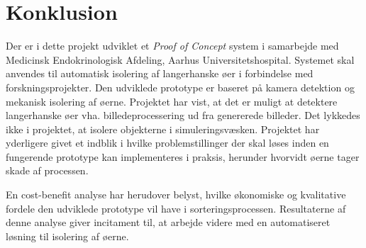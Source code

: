 \chapter{Konklusion}
Der er i dette projekt udviklet et \textit{Proof of Concept} system i samarbejde med Medicinsk Endokrinologisk Afdeling, Aarhus Universitetshospital. Systemet skal anvendes til automatisk isolering af langerhanske øer i forbindelse med forskningsprojekter. Den udviklede prototype er baseret på kamera detektion og mekanisk isolering af øerne. Projektet har vist, at det er muligt at detektere langerhanske øer vha. billedeprocessering ud fra genererede billeder. Det lykkedes ikke i projektet, at isolere objekterne i simuleringsvæsken. Projektet har yderligere givet et indblik i hvilke problemstillinger der skal løses inden en fungerende prototype kan implementeres i praksis, herunder hvorvidt øerne tager skade af processen. 

En cost-benefit analyse har herudover belyst, hvilke økonomiske og kvalitative fordele den udviklede prototype vil have i sorteringsprocessen. Resultaterne af denne analyse giver incitament til, at arbejde videre med en automatiseret løsning til isolering af øerne. 

